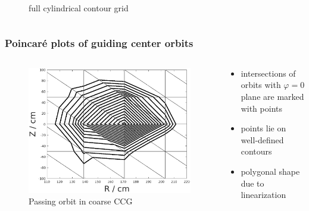 \documentclass{beamer}
\begin{document}
\begin{frame}
\begin{columns}[onlytextwidth]
\begin{column}{0.5\textwidth}
\begin{center}
\begin{figure}
		\caption{full cylindrical contour grid}
	\end{figure}
\end{center}
	\end{column}
\end{columns}
\end{frame}

\begin{frame}
\frametitle{Poincaré plots of guiding center orbits}
\vspace{-0.75 cm}
\begin{columns}[onlytextwidth]
	\begin{column}{0.55\textwidth}
		\begin{center}
			\begin{figure}
				\includegraphics[trim={0cm 0cm 0cm 0cm},clip,width=1\textwidth]{FIGURES/field_lines_rect_grid2.eps}
				\caption{Passing orbit in coarse CCG}
			\end{figure}
		\end{center}
	\end{column}
	\begin{column}{0.45\textwidth}
		\vspace{0 cm}
		\begin{center}
			\begin{itemize}
				\item intersections of orbits with $\varphi=0$ plane are marked with points
				\item points lie on well-defined contours
				\item polygonal shape due to linearization 
			\end{itemize}
		\end{center}
	\end{column}
\end{columns}
\end{frame}
\end{document}
